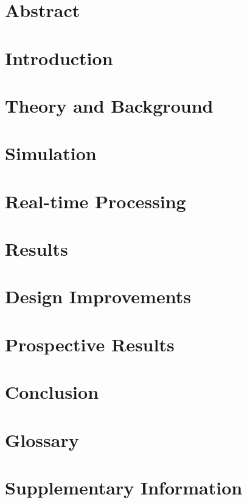 \documentclass[a4paper, english, twoside, 12pt]{article}
\begin{document}
%

\thispagestyle{empty}

\pagebreak
\restoregeometry
{}

\listoftodos

\pagebreak

\glsunsetall
\tableofcontents
\pagebreak
\listoffigures
\glsresetall
\pagebreak

\section{Abstract}

\pagebreak
\section{Introduction}

\pagebreak
\section{Theory and Background}

\pagebreak
\section{Simulation}

\pagebreak
\section{Real-time Processing}

\pagebreak
\section{Results}

\pagebreak
\section{Design Improvements}

\pagebreak
\section{Prospective Results}

\pagebreak
\section{Conclusion}

\pagebreak

\pagebreak
\begin{appendices} 
	\section{Glossary}
	\printglossaries
	\section{Supplementary Information}
	
\end{appendices}
\end{document}
